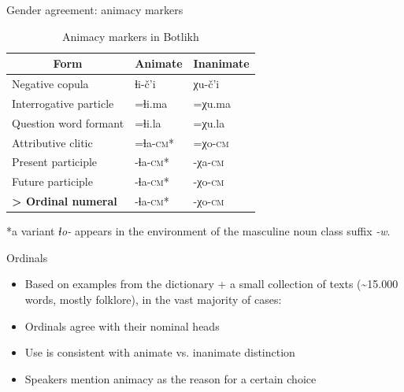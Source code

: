 \begin{frame}{Gender agreement: animacy markers}



\begin{table}[H]
\caption{Animacy markers in Botlikh}
\begin{center}
\label{tab:animparad}
\begin{tabular}{lll}
\multicolumn{1}{c}{Form} & \multicolumn{1}{c}{Animate} & \multicolumn{1}{c}{Inanimate}                                                      \\ \hline
Negative copula          & ɬi-č'i                      & χu-č'i \\                      
Interrogative particle   & =ɬi.ma                      & =χu.ma \\                  
Question word formant    & =ɬi.la                      & =χu.la \\                  
Attributive clitic       & =ɬa-\textsc{cm}*                     & =χo-\textsc{cm} \\                    
Present participle       & -ɬa-\textsc{cm}*                      & -χa-\textsc{cm} \\
Future participle        & -ɬa-\textsc{cm}*                      & -χo-\textsc{cm} \\
\textbf{> Ordinal numeral}          & -ɬa-\textsc{cm}*                      & -χo-\textsc{cm}
\end{tabular}
\end{center}
\end{table}

*a variant \textit{ɬo-} appears in the environment of the masculine noun class suffix \textit{-w}.

\end{frame}

\begin{frame}{Ordinals}

\begin{itemize}
    \item Based on examples from the dictionary + a small collection of texts (\textasciitilde{}15.000 words, mostly folklore), in the vast majority of cases:
    \item Ordinals agree with their nominal heads
    \item Use is consistent with animate vs. inanimate distinction
    \pause
    \item Speakers mention animacy as the reason for a certain choice 
\end{itemize}

\end{frame}

